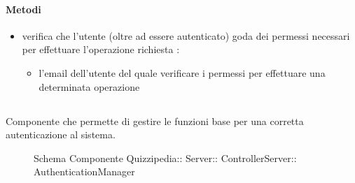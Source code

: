 \paragraph{Metodi}
\begin{itemize}
\item {}
\newline
verifica che l'utente (oltre ad essere autenticato) goda dei permessi necessari per effettuare l'operazione richiesta
\newline
{} :
\begin{itemize}
\item {}
\newline
l'email dell'utente del quale verificare i permessi per effettuare una determinata operazione
\end{itemize}
\end{itemize}
\subsection{}
Componente che permette di gestire le funzioni base per una corretta autenticazione al sistema.
\begin{figure}[H]
\centering
\noindent{}
\caption[Schema Componente Quizzipedia::Server::ControllerServer::AuthenticationManager]{Schema Componente Quizzipedia:: Server:: ControllerServer:: AuthenticationManager}
\end{figure}
